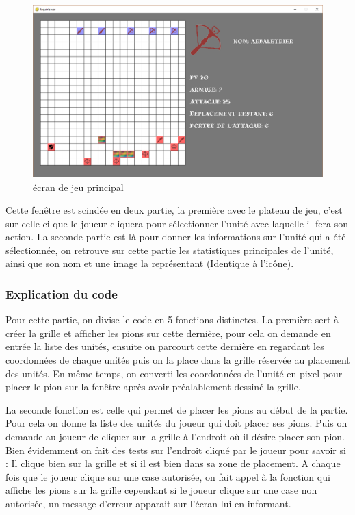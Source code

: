 \documentclass{article}
\begin{document}
	\begin{figure}[h]
     \center
      \includegraphics[scale=0.2]{../images/main.PNG}
     \caption{écran de jeu principal}
    \end{figure}
    	
	
	
	Cette fenêtre est scindée en deux partie, la première avec le plateau de jeu, c'est sur celle-ci que le joueur cliquera pour sélectionner  l'unité avec laquelle il fera son action. La seconde partie est là pour donner les informations sur l'unité qui a été sélectionnée, on retrouve sur cette partie les statistiques principales de l'unité, ainsi que son nom et une image la représentant (Identique à l'icône).
	
  \subsubsection{Explication du code }
	Pour cette partie, on divise le code en 5 fonctions distinctes. La première sert à créer la grille et afficher les pions sur cette dernière, pour cela on demande en entrée la liste des unités, ensuite on parcourt cette dernière en regardant les coordonnées de chaque unités puis on la place dans la grille réservée au placement des unités. En même temps, on converti les coordonnées de l'unité en pixel pour placer le pion sur la fenêtre après avoir préalablement dessiné la grille.
	
	La seconde fonction est celle qui permet de placer les pions au début de la partie. Pour cela on donne la liste des unités du joueur qui doit placer ses pions. Puis on demande au joueur de cliquer sur la grille à l'endroit où il désire placer son pion. Bien évidemment on fait des tests sur l'endroit cliqué par le joueur pour savoir si : Il clique bien sur la grille et si il est bien dans sa zone de placement. A chaque fois que le joueur clique sur une case autorisée, on fait appel à la fonction qui affiche les pions sur la grille cependant si le joueur clique sur une case non autorisée, un message d'erreur apparait sur l'écran lui en informant.
	
\end{document}
